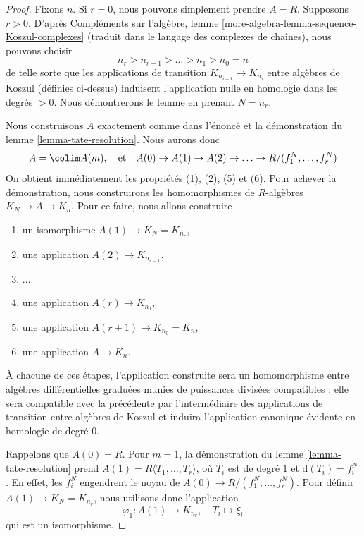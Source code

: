 \begin{proof}
Fixons $n$. Si $r = 0$, nous pouvons simplement prendre $A = R$. Supposons $r > 0$.
D'après Compléments sur l'algèbre, lemme \ref{more-algebra-lemma-sequence-Koszul-complexes}
(traduit dans le langage des complexes de chaînes), nous pouvons choisir
$$
n_{r} > n_{r - 1} > \ldots > n_1 > n_0 = n
$$
de telle sorte que les applications de transition $K_{n_{i + 1}} \to K_{n_i}$ entre
algèbres de Koszul (définies ci-dessus) induisent l'application nulle en homologie dans les degrés $> 0$.
Nous démontrerons le lemme en prenant $N = n_r$.

\medskip\noindent
Nous construisons $A$ exactement comme dans l'énoncé et la démonstration
du lemme \ref{lemma-tate-resolution}. Nous aurons donc
$$
A = \colim A(m),\quad\text{et}\quad
A(0) \to A(1) \to A(2) \to\ldots\to R/(f_1^N, \ldots, f_r^N)
$$
On obtient immédiatement les propriétés (1), (2), (5) et (6). Pour achever la
démonstration, nous construirons les homomorphismes de $R$-algèbres
$K_N \to A \to K_n$. Pour ce faire, nous allons construire
\begin{enumerate}
\item un isomorphisme $A(1) \to K_N = K_{n_r}$,
\item une application $A(2) \to K_{n_{r - 1}}$,
\item $\ldots$
\item une application $A(r) \to K_{n_1}$,
\item une application $A(r + 1) \to K_{n_0} = K_n$,
\item une application $A \to K_n$.
\end{enumerate}
À chacune de ces étapes, l'application construite sera un
homomorphisme entre algèbres différentielles graduées munies de puissances
divisées compatibles ; elle sera compatible avec la
précédente par l'intermédiaire des applications de transition entre
algèbres de Koszul et induira l'application canonique évidente en
homologie de degré $0$.

\medskip\noindent
Rappelons que $A(0) = R$. Pour $m = 1$, la démonstration
du lemme \ref{lemma-tate-resolution}
prend $A(1) = R\langle T_1, \ldots, T_r\rangle$, où
$T_i$ est de degré $1$ et $\text{d}(T_i) = f_i^N$.
En effet, les $f_i^N$ engendrent le noyau de
$A(0) \to R/(f_1^N, \ldots, f_r^N)$.
Pour définir $A(1) \to K_N = K_{n_r}$, nous utilisons donc l'application
$$
\varphi_1 : A(1) \longrightarrow K_{n_r},\quad T_i \longmapsto\xi_i
$$
qui est un isomorphisme.


\end{proof}

